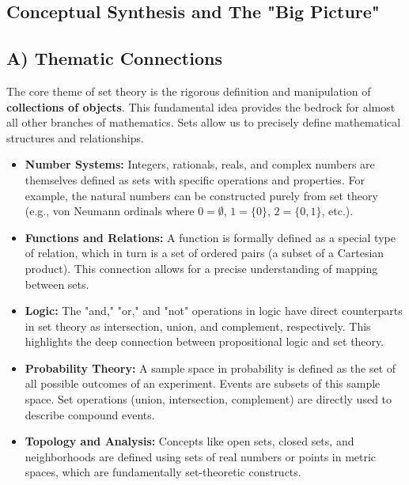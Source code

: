 \documentclass{article}
\begin{document}
\begin{itemize}
\begin{itemize}
\begin{itemize}
\begin{enumerate}
\section{Conceptual Synthesis and The "Big Picture"}

\subsection{A) Thematic Connections}
The core theme of set theory is the rigorous definition and manipulation of \textbf{collections of objects}. This fundamental idea provides the bedrock for almost all other branches of mathematics. Sets allow us to precisely define mathematical structures and relationships.

\begin{itemize}
    \item \textbf{Number Systems:} Integers, rationals, reals, and complex numbers are themselves defined as sets with specific operations and properties. For example, the natural numbers can be constructed purely from set theory (e.g., von Neumann ordinals where $0 = \emptyset$, $1 = \{0\}$, $2 = \{0, 1\}$, etc.).
    \item \textbf{Functions and Relations:} A function is formally defined as a special type of relation, which in turn is a set of ordered pairs (a subset of a Cartesian product). This connection allows for a precise understanding of mapping between sets.
    \item \textbf{Logic:} The "and," "or," and "not" operations in logic have direct counterparts in set theory as intersection, union, and complement, respectively. This highlights the deep connection between propositional logic and set theory.
    \item \textbf{Probability Theory:} A sample space in probability is defined as the set of all possible outcomes of an experiment. Events are subsets of this sample space. Set operations (union, intersection, complement) are directly used to describe compound events.
\item \textbf{Topology and Analysis:} Concepts like open sets, closed sets, and neighborhoods are defined using sets of real numbers or points in metric spaces, which are fundamentally set-theoretic constructs.
\end{itemize}


\end{enumerate}
\end{itemize}
\end{itemize}
\end{itemize}
\end{document}
